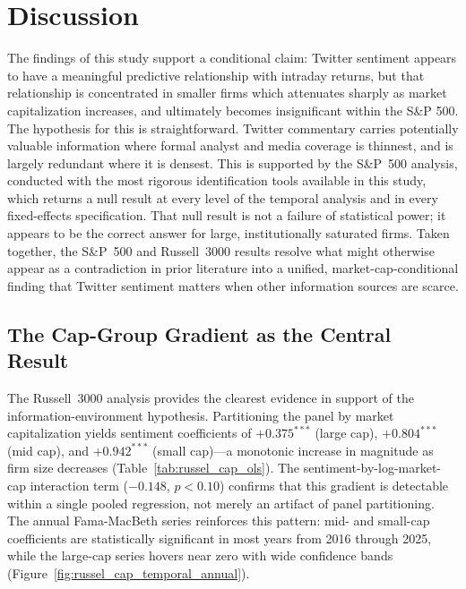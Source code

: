 
\section{Discussion}\label{discussion}

The findings of this study support a conditional claim: Twitter sentiment
appears to have a meaningful predictive relationship with intraday returns, but
that relationship is concentrated in smaller firms which attenuates sharply as
market capitalization increases, and ultimately becomes insignificant within the S\&P 500. The hypothesis for this is
straightforward. Twitter commentary carries potentially valuable information where formal
analyst and media coverage is thinnest, and is largely redundant where it is
densest. This is supported by the S\&P~500 analysis, conducted with the most rigorous identification
tools available in this study, which returns a null result at every level of the
temporal analysis and in every fixed-effects specification. That null result is
not a failure of statistical power; it appears to be the correct answer for large,
institutionally saturated firms. Taken together, the S\&P~500 and Russell~3000
results resolve what might otherwise appear as a contradiction in prior
literature into a unified, market-cap-conditional finding that Twitter sentiment matters when other information sources are scarce.

\subsection{The Cap-Group Gradient as the Central
Result}\label{cap-group-gradient}

The Russell~3000 analysis provides the clearest evidence in support of the
information-environment hypothesis. Partitioning the panel by market
capitalization yields sentiment coefficients of $+0.375^{***}$ (large cap),
$+0.804^{***}$ (mid cap), and $+0.942^{***}$ (small cap)---a monotonic
increase in magnitude as firm size decreases
(Table~\ref{tab:russel_cap_ols}). The sentiment-by-log-market-cap interaction
term ($-0.148$, $p < 0.10$) confirms that this gradient is detectable within a
single pooled regression, not merely an artifact of panel partitioning. The
annual Fama-MacBeth series reinforces this pattern: mid- and small-cap
coefficients are statistically significant in most years from 2016 through
2025, while the large-cap series hovers near zero with wide confidence bands
(Figure~\ref{fig:russel_cap_temporal_annual}).

